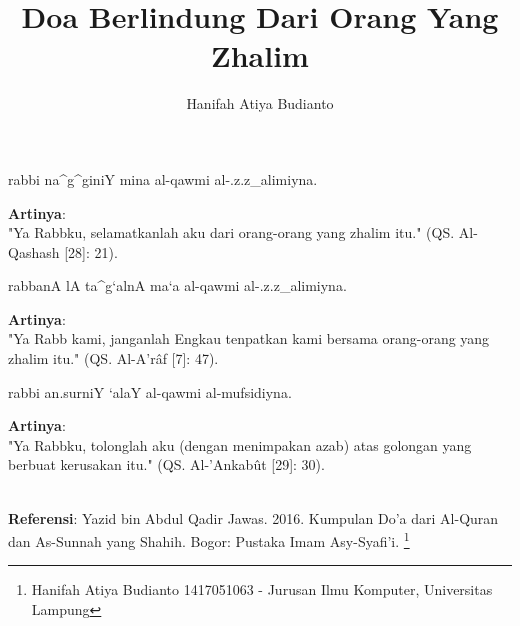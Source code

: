 \documentclass[a4paper,12pt]{article}
\title{\Large Doa Berlindung Dari Orang Yang Zhalim}
\author{\calligra Hanifah Atiya Budianto}
\begin{document}
\sffamily
\maketitle 
\fullvocalize
{}
\begin{arabtext}
\noindent
rabbi na^g^giniY mina al-qawmi al-.z.z_alimiyna.\\
\end{arabtext}
\noindent
\textbf{Artinya}:\\
\indent
"Ya Rabbku, selamatkanlah aku dari orang-orang yang zhalim itu." (QS. 
Al-Qashash [28]: 21).\\
\begin{arabtext}
\noindent
rabbanA lA ta^g`alnA ma`a al-qawmi al-.z.z_alimiyna.\\
\end{arabtext}
\noindent
\textbf{Artinya}:\\
\indent
"Ya Rabb kami, janganlah Engkau tenpatkan kami bersama orang-orang yang 
zhalim itu." (QS. Al-A'r\^{a}f [7]: 47).\\
\begin{arabtext}
\noindent
rabbi an.surniY `alaY al-qawmi al-mufsidiyna.\\
\end{arabtext}
\noindent
\textbf{Artinya}:\\
\indent
"Ya Rabbku, tolonglah aku (dengan menimpakan azab) atas golongan yang 
berbuat kerusakan itu." (QS. Al-'Ankab\^{u}t [29]: 30).\\\\
\par
\noindent
\textbf{Referensi}: Yazid bin Abdul Qadir Jawas. 2016. Kumpulan Do'a dari
Al-Quran dan As-Sunnah yang Shahih. Bogor: Pustaka Imam Asy-Syafi'i.
\footnote{Hanifah Atiya Budianto 1417051063 - Jurusan Ilmu Komputer,
Universitas Lampung}
\end{document}
